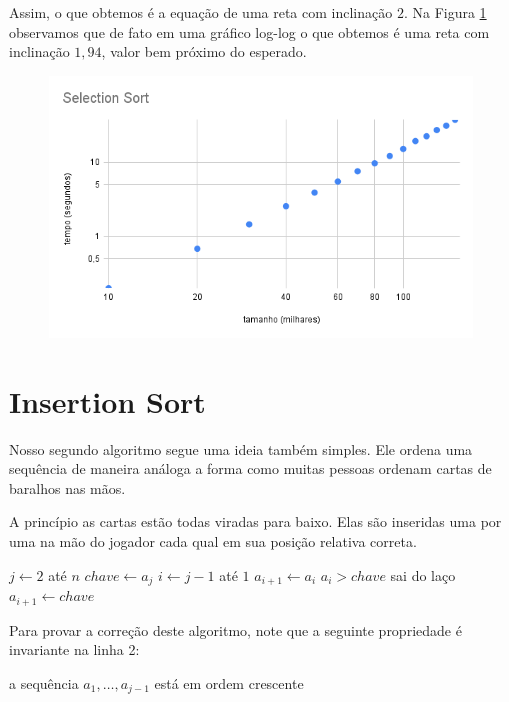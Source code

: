   Assim, o que obtemos é a equação de uma reta com inclinação $2$.
  Na Figura \ref{} observamos que de fato em uma gráfico log-log o que obtemos é uma reta com inclinação $1,94$, valor bem próximo do esperado.

  \begin{figure}
    \includegraphics[width=\textwidth]{imagens/SelectionSort2.png}
  \end{figure}

  
  \section{Insertion Sort}

  Nosso segundo algoritmo segue uma ideia também simples.
  Ele ordena uma sequência de maneira análoga a forma como muitas pessoas ordenam cartas de baralhos nas mãos.

  A princípio as cartas estão todas viradas para baixo.
  Elas são inseridas uma por uma na mão do jogador cada qual em sua posição relativa correta.

   \begin{codebox}
     \li \For $j \gets 2$ até $n$
     \li \Do $chave \gets a_j$
     \li    \For $i \gets j-1$ até $1$
     \li    \Do $a_{i+1} \gets a_i$
     \li       \If $a_i > chave$
     \li       \Then sai do laço
               \End
            \End
     \li    $a_{i+1} \gets chave$
     \End
   \end{codebox}

   Para provar a correção deste algoritmo, note que a seguinte propriedade é invariante na linha 2:

   \begin{center}
     a sequência $a_1, \dots, a_{j-1}$ está em ordem crescente
   \end{center}


